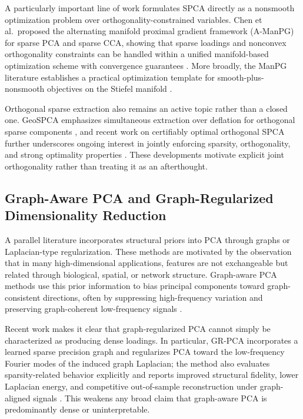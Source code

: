 \documentclass[10pt,twocolumn,letterpaper]{article}
\theoremstyle{definition}
\begin{document}
A particularly important line of work formulates SPCA directly as a nonsmooth optimization problem over orthogonality-constrained variables. Chen et al.\ proposed the alternating manifold proximal gradient framework (A-ManPG) for sparse PCA and sparse CCA, showing that sparse loadings and nonconvex orthogonality constraints can be handled within a unified manifold-based optimization scheme with convergence guarantees \cite{chen2020amanpg}. More broadly, the ManPG literature establishes a practical optimization template for smooth-plus-nonsmooth objectives on the Stiefel manifold \cite{chen2020manpg,chen2024nonsmoothstiefel}.

Orthogonal sparse extraction also remains an active topic rather than a closed one. GeoSPCA emphasizes simultaneous extraction over deflation for orthogonal sparse components \cite{bertsimas2023geospca}, and recent work on certifiably optimal orthogonal SPCA further underscores ongoing interest in jointly enforcing sparsity, orthogonality, and strong optimality properties \cite{cheng2026orthogonalspca}. These developments motivate explicit joint orthogonality rather than treating it as an afterthought.

\subsection{Graph-Aware PCA and Graph-Regularized Dimensionality Reduction}
A parallel literature incorporates structural priors into PCA through graphs or Laplacian-type regularization. These methods are motivated by the observation that in many high-dimensional applications, features are not exchangeable but related through biological, spatial, or network structure. Graph-aware PCA methods use this prior information to bias principal components toward graph-consistent directions, often by suppressing high-frequency variation and preserving graph-coherent low-frequency signals \cite{briola2026grpca,chung1997spectral,shuman2013gsp}.

Recent work makes it clear that graph-regularized PCA cannot simply be characterized as producing dense loadings. In particular, GR-PCA incorporates a learned sparse precision graph and regularizes PCA toward the low-frequency Fourier modes of the induced graph Laplacian; the method also evaluates sparsity-related behavior explicitly and reports improved structural fidelity, lower Laplacian energy, and competitive out-of-sample reconstruction under graph-aligned signals \cite{briola2026grpca}. This weakens any broad claim that graph-aware PCA is predominantly dense or uninterpretable.
\end{document}
